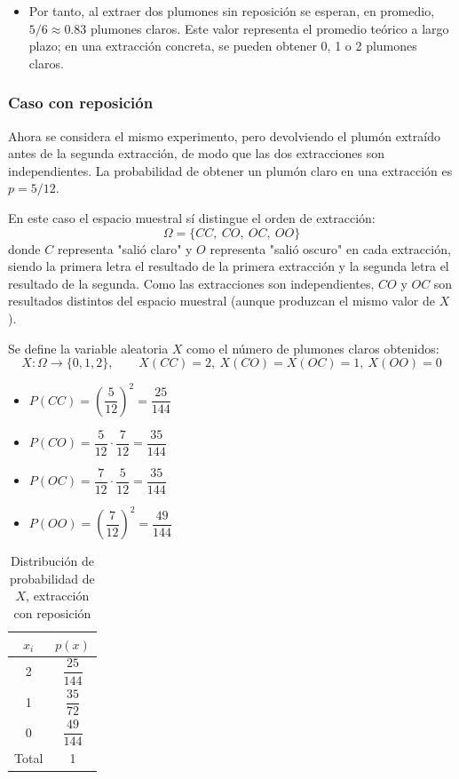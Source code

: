 \documentclass[10pt,letterpaper]{article}
\begin{document}
\begin{itemize}
    \item Por tanto, al extraer dos plumones sin reposición se esperan, en promedio,
    $5/6 \approx 0.83$ plumones claros. Este valor representa el promedio teórico
    a largo plazo; en una extracción concreta, se pueden obtener 0, 1 o 2 plumones claros.
\end{itemize}

\subsubsection{Caso con reposición}

Ahora se considera el mismo experimento, pero devolviendo el plumón extraído antes de la segunda extracción, de modo que las dos extracciones son independientes. La probabilidad de obtener un plumón claro en una extracción es $p = 5/12$.

En este caso el espacio muestral sí distingue el orden de extracción:
\begin{equation}
    \Omega = \{CC,\ CO,\ OC,\ OO\}
\end{equation}
donde $C$ representa "salió claro" y $O$ representa "salió oscuro" en cada extracción, siendo la primera letra el resultado de la primera extracción y la segunda letra el resultado de la segunda. Como las extracciones son independientes, $CO$ y $OC$ son resultados distintos del espacio muestral (aunque produzcan el mismo valor de $X$).

Se define la variable aleatoria $X$ como el número de plumones claros obtenidos:
\begin{equation}
    X: \Omega \rightarrow \{0,1,2\}, \qquad X(CC)=2,\ X(CO)=X(OC)=1,\ X(OO)=0
\end{equation}

\begin{itemize}
    \item $P(CC) = \left(\dfrac{5}{12}\right)^2 = \dfrac{25}{144}$
    \item $P(CO) = \dfrac{5}{12}\cdot\dfrac{7}{12} = \dfrac{35}{144}$
    \item $P(OC) = \dfrac{7}{12}\cdot\dfrac{5}{12} = \dfrac{35}{144}$
    \item $P(OO) = \left(\dfrac{7}{12}\right)^2 = \dfrac{49}{144}$
\end{itemize}

\begin{table}[h]
    \centering
    \begin{tabular}{|c|c|}
        \hline
        $x_i$ & $p(x)$ \\
        \hline
        2 & $\dfrac{25}{144}$ \\[10pt]
        1 & $\dfrac{35}{72}$ \\[10pt]
        0 & $\dfrac{49}{144}$ \\
        \hline
        Total & 1 \\
        \hline
    \end{tabular}
    \caption{Distribución de probabilidad de $X$, extracción con reposición}
\end{table}
\end{document}
